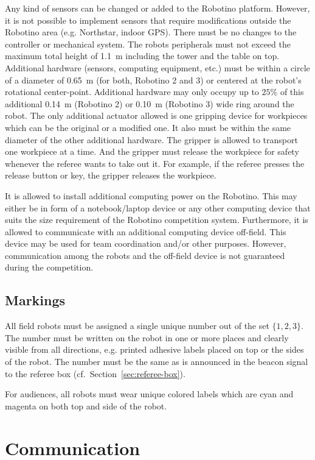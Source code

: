 \documentclass[12pt,twoside]{article}
\newcommand{\Robotino}{Robotino}
\newcommand{\refsec}[1]{Section~\ref{#1}}
\begin{document}
Any kind of sensors can be changed or added to	 the Robotino platform.
However, it is not possible to implement sensors that require 
modifications outside the Robotino area (e.g. Northstar, indoor GPS).
There must be no changes to the controller or mechanical system.
The robots peripherals must not exceed the maximum total height of 
\SI{1.1}{\metre} including the tower and the table on top. Additional
hardware (sensors, computing equipment, etc.)  must be within a circle 
of a diameter of \SI{0.65}{\metre}  (for both, Robotino 2 and 3) or 
centered at the robot's rotational center-point. Additional hardware 
may only occupy up to $25\%$ of this additional \SI{0.14}{\metre} 
(Robotino 2) or \SI{0.10}{\metre} (Robotino 3) wide ring around the 
robot. The only additional actuator allowed is one gripping device for 
workpieces which can be the original or a modified one. It also must 
be within the same diameter of the other additional hardware. The 
gripper is allowed to transport one workpiece at a time. And the 
gripper must release the workpiece for safety whenever the referee 
wants to take out it. For example, if the referee presses the release 
button or key, the gripper releases the workpiece.

It is allowed to install additional computing power on the
\Robotino. This may either be in form of a notebook/laptop device or
any other computing device that suits the size requirement of the
\Robotino{} competition system. Furthermore, it is allowed to
communicate with an additional computing device off-field. This device
may be used for team coordination and/or other purposes. However,
communication among the robots and the off-field device is not
guaranteed during the competition.

\subsection{Markings}
\label{sec:robot-markings}
All field robots must be assigned a single unique number out of the
set $\{1, 2, 3\}$. The number must be written on the robot in one or
more places and clearly visible from all directions, e.g. printed
adhesive labels placed on top or the sides of the robot. The number
must be the same as is announced in the beacon signal to the referee
box (cf.~\refsec{sec:referee-box}).

For audiences, all robots must wear unique colored labels which are 
cyan and magenta on both top and side of the robot.

\section{Communication}
\label{sec:communication}
\end{document}
